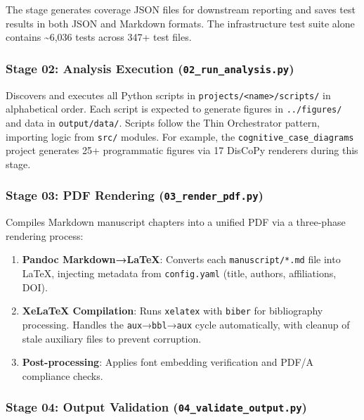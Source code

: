 \documentclass[
]{article}
\providecommand{\tightlist}{%
  \setlength{\itemsep}{0pt}\setlength{\parskip}{0pt}}
\begin{document}
The stage generates coverage JSON files for downstream reporting and
saves test results in both JSON and Markdown formats. The infrastructure
test suite alone contains \textasciitilde6,036 tests across 347+ test
files.

\subsubsection{\texorpdfstring{Stage 02: Analysis Execution
(\texttt{02\_run\_analysis.py})}{Stage 02: Analysis Execution (02\_run\_analysis.py)}}\label{stage-02-analysis-execution-02_run_analysis.py}

Discovers and executes all Python scripts in
\texttt{projects/\textless{}name\textgreater{}/scripts/} in alphabetical
order. Each script is expected to generate figures in
\texttt{../figures/} and data in \texttt{output/data/}. Scripts follow
the Thin Orchestrator pattern, importing logic from \texttt{src/}
modules. For example, the \texttt{cognitive\_case\_diagrams} project
generates 25+ programmatic figures via 17 DisCoPy renderers during this
stage.

\subsubsection{\texorpdfstring{Stage 03: PDF Rendering
(\texttt{03\_render\_pdf.py})}{Stage 03: PDF Rendering (03\_render\_pdf.py)}}\label{stage-03-pdf-rendering-03_render_pdf.py}

Compiles Markdown manuscript chapters into a unified PDF via a
three-phase rendering process:

\begin{enumerate}
\def\labelenumi{\arabic{enumi}.}
\tightlist
\item
  \textbf{Pandoc Markdown→LaTeX}: Converts each \texttt{manuscript/*.md}
  file into LaTeX, injecting metadata from \texttt{config.yaml} (title,
  authors, affiliations, DOI).
\item
  \textbf{XeLaTeX Compilation}: Runs \texttt{xelatex} with
  \texttt{biber} for bibliography processing. Handles the
  \texttt{aux}→\texttt{bbl}→\texttt{aux} cycle automatically, with
  cleanup of stale auxiliary files to prevent corruption.
\item
  \textbf{Post-processing}: Applies font embedding verification and
  PDF/A compliance checks.
\end{enumerate}

\subsubsection{\texorpdfstring{Stage 04: Output Validation
(\texttt{04\_validate\_output.py})}{Stage 04: Output Validation (04\_validate\_output.py)}}\label{stage-04-output-validation-04_validate_output.py}
\end{document}
